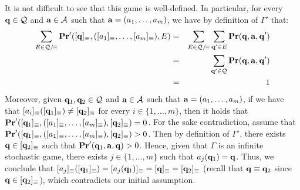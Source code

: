 \documentclass{article}
\begin{document}
It is not difficult to see that this game is well-defined. In particular, for every $\mathbf{q} \in \mathcal{Q}$ and $\mathbf{a} \in  \mathcal{A}$ such that $\mathbf{a} = (a_1, \ldots, a_m)$, we have by definition of $\Gamma'$ that:
\begin{eqnarray*}
\sum_{E \in \mathcal{Q}/\!\equiv} \mathbf{Pr}'([\mathbf{q}]_\equiv, ([a_1]_\equiv, \ldots, [a_m]_\equiv), E) & = & \sum_{E \in \mathcal{Q}/\!\equiv} \sum_{\mathbf{q}' \in E} \mathbf{Pr}(\mathbf{q}, \mathbf{a}, \mathbf{q}')\\
& = & \sum_{\mathbf{q}' \in \mathcal{Q}} \mathbf{Pr}(\mathbf{q}, \mathbf{a}, \mathbf{q}')\\
& = & 1
\end{eqnarray*}
Moreover, given $\mathbf{q}_1, \mathbf{q}_2 \in \mathcal{Q}$ and $\mathbf{a} \in \mathcal{A}$ such that $\mathbf{a} = (a_1, \ldots, a_m)$, if we have that $[a_i]_\equiv([\mathbf{q}_1]_\equiv) \neq [\mathbf{q}_2]_\equiv$ for every $i \in \{1, \ldots, m\}$, then it holds that $\mathbf{Pr}'([\mathbf{q}_1]_\equiv, ([a_1]_\equiv, \ldots, [a_m]_\equiv), [\mathbf{q}_2]_\equiv) = 0$. For the sake contradiction, assume that $\mathbf{Pr}'([\mathbf{q}_1]_\equiv, ([a_1]_\equiv, \ldots, [a_m]_\equiv), [\mathbf{q}_2]_\equiv) > 0$. Then by definition of $\Gamma'$, there exists $\mathbf{q} \in [\mathbf{q}_2]_\equiv$ such that $\mathbf{Pr}'(\mathbf{q}_1, \mathbf{a}, \mathbf{q}) > 0$. Hence, given that 
$\Gamma$ is an infinite stochastic game, there exists $j \in \{1, \ldots, m\}$ such that $a_j(\mathbf{q}_1) = \mathbf{q}$. Thus, we conclude that $[a_j]_\equiv([\mathbf{q}_1]_\equiv) = [a_j(\mathbf{q}_1)]_\equiv = [\mathbf{q}]_\equiv = [\mathbf{q}_2]_\equiv$ (recall that $\mathbf{q} \equiv \mathbf{q}_2$ since $\mathbf{q} \in [\mathbf{q}_2]_\equiv$), which contradicts our initial assumption. 
\end{document}
